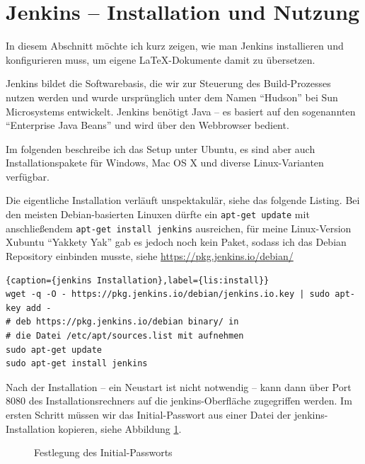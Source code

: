 \section{Jenkins -- Installation und Nutzung}

In diesem Abschnitt möchte ich kurz zeigen, wie man Jenkins installieren und konfigurieren muss, um eigene \LaTeX-Dokumente damit zu übersetzen.

Jenkins bildet die Softwarebasis, die wir zur Steuerung des Build-Prozesses nutzen werden und wurde ursprünglich unter dem Namen \enquote{Hudson} bei Sun Microsystems entwickelt. Jenkins benötigt Java -- es basiert auf den sogenannten \enquote{Enterprise Java Beans} und wird über den Webbrowser bedient. 

Im folgenden beschreibe ich das Setup unter Ubuntu, es sind aber auch Installationspakete für Windows, Mac OS X und diverse Linux-Varianten verfügbar.

Die eigentliche Installation verläuft unspektakulär, siehe das folgende Listing. Bei den meisten Debian-basierten Linuxen dürfte ein \lstinline{apt-get update} mit anschließendem \lstinline{apt-get install jenkins} ausreichen, für meine Linux-Version Xubuntu \enquote{Yakkety Yak} gab es jedoch noch kein Paket, sodass ich das Debian Repository einbinden musste, siehe \url{https://pkg.jenkins.io/debian/}

\begin{lstlisting}{caption={jenkins Installation},label={lis:install}}
wget -q -O - https://pkg.jenkins.io/debian/jenkins.io.key | sudo apt-key add -
# deb https://pkg.jenkins.io/debian binary/ in 
# die Datei /etc/apt/sources.list mit aufnehmen
sudo apt-get update
sudo apt-get install jenkins
\end{lstlisting}

Nach der Installation -- ein Neustart ist nicht notwendig -- kann dann über Port 8080 des Installationsrechners auf die jenkins-Oberfläche zugegriffen werden. Im ersten Schritt müssen wir das Initial-Passwort aus einer Datei der jenkins-Installation kopieren, siehe Abbildung \ref{fig:initial}.

\begin{figure}
\caption{Festlegung des Initial-Passworts}\label{fig:initial}
\end{figure}

